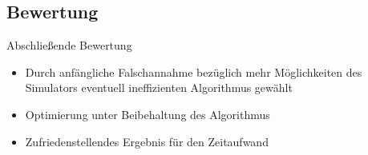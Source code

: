 \documentclass{beamer}
\begin{document}
\subsection{Bewertung} %



\begin{frame}{Abschließende Bewertung}
\begin{itemize}
    \item Durch anfängliche Falschannahme bezüglich mehr Möglichkeiten des Simulators eventuell ineffizienten Algorithmus gewählt
    \item Optimierung unter Beibehaltung des Algorithmus
    \item Zufriedenstellendes Ergebnis für den Zeitaufwand
\end{itemize}
\end{frame}






\end{document}
